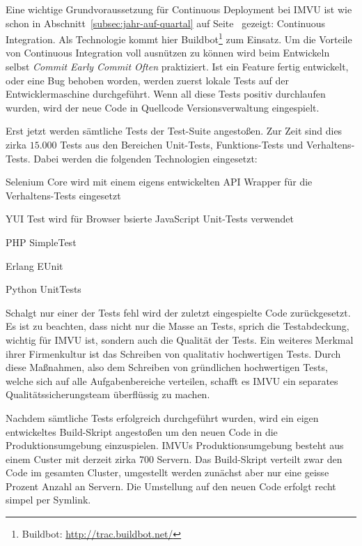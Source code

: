  Eine wichtige Grundvoraussetzung für Continuous Deployment
bei IMVU ist wie schon in Abschnitt~\ref{subsec:jahr-auf-quartal} auf
Seite~\pageref{subsec:jahr-auf-quartal} gezeigt: Continuous Integration. Als
Technologie kommt hier Buildbot\footnote{Buildbot:
\url{http://trac.buildbot.net/}} zum Einsatz. Um die Vorteile von Continuous
Integration voll ausnützen zu können wird beim Entwickeln selbst \emph{Commit
Early Commit Often} praktiziert. Ist ein Feature fertig entwickelt, oder eine
Bug behoben worden, werden zuerst lokale  Tests auf der Entwicklermaschine
durchgeführt. Wenn all diese Tests positiv durchlaufen wurden, wird der neue
Code in Quellcode Versionsverwaltung eingespielt.

Erst jetzt werden sämtliche Tests der Test-Suite angestoßen. Zur Zeit sind
dies zirka $15.000$ Tests aus den Bereichen Unit-Tests, Funktions-Tests und
Verhaltens-Tests. Dabei werden die folgenden Technologien eingesetzt:

\begin{itemize*}
    \item Selenium Core wird mit einem eigens entwickelten API Wrapper für
          die Verhaltens-Tests eingesetzt
    \item YUI Test wird für Browser bsierte JavaScript Unit-Tests verwendet
    \item PHP SimpleTest
    \item Erlang EUnit
    \item Python UnitTests
\end{itemize*}

Schalgt nur einer der Tests fehl wird der zuletzt eingespielte Code
zurückgesetzt. Es ist zu beachten, dass nicht nur die Masse an Tests, sprich
die Testabdeckung, wichtig für IMVU ist, sondern auch die Qualität der Tests.
Ein weiteres Merkmal ihrer Firmenkultur ist das Schreiben von qualitativ
hochwertigen Tests. Durch diese Maßnahmen, also dem Schreiben von gründlichen
hochwertigen Tests, welche sich auf alle Aufgabenbereiche verteilen, schafft
es IMVU ein separates Qualitätssicherungsteam überflüssig zu machen.

Nachdem sämtliche Tests erfolgreich durchgeführt wurden, wird ein eigen
entwickeltes Build-Skript angestoßen um den neuen Code in die
Produktionsumgebung einzuspielen. IMVUs Produktionsumgebung besteht aus einem
Custer mit derzeit zirka 700 Servern. Das Build-Skript verteilt zwar den Code
im gesamten Cluster, umgestellt werden zunächst aber nur eine geisse Prozent
Anzahl an Servern. Die Umstellung auf den neuen Code erfolgt recht simpel per
Symlink. 

